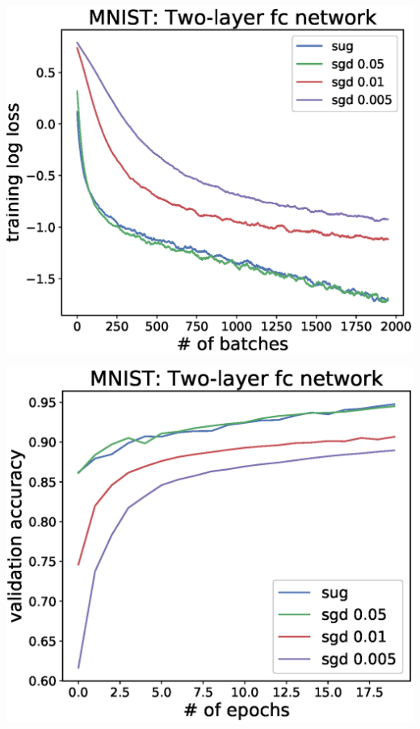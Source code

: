 \documentclass[a0]{a0poster}
\begin{document}
\begin{textblock}{7.0}
\begin{minipage}{0.35\textwidth}
	\begin{center}
		\includegraphics[width=1\textwidth]{figures/mnist_fc_bt.eps}
	\end{center}
\end{minipage}
\begin{minipage}{0.35\textwidth}
	\begin{center}
		\includegraphics[width=1\textwidth]{figures/mnist_fc_acc.eps}

\end{center}
\end{minipage}
\end{textblock}
\end{document}

